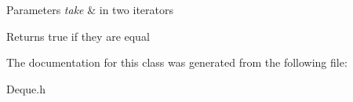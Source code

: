 \begin{DoxyParams}{Parameters}
{\em take} & in two iterators \\
\hline
\end{DoxyParams}
\begin{DoxyReturn}{Returns}
true if they are equal 
\end{DoxyReturn}


The documentation for this class was generated from the following file\-:\begin{DoxyCompactItemize}
\item 
Deque.\-h\end{DoxyCompactItemize}
